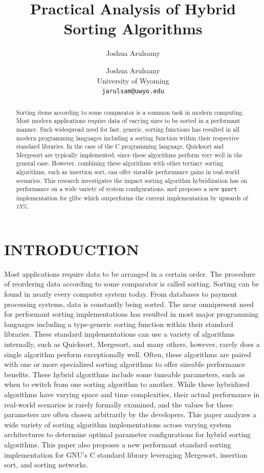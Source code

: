 \documentclass[12pt, conference]{ieeeconf}
\title{\LARGE \bf Practical Analysis of Hybrid Sorting Algorithms}
\author{Joshua Arulsamy}
\author{\parbox{3 in}{
\centering
Joshua Arulsamy\\
University of Wyoming\\
{\tt\small jarulsam@uwyo.edu}}}
\begin{document}
\maketitle
\thispagestyle{plain}
\pagestyle{plain}
\nocite{*}

\begin{abstract}

  Sorting items according to some comparator is a common task in modern
  computing. Most modern applications require data of varying sizes to be sorted
  in a performant manner. Such widespread need for fast, generic, sorting
  functions has resulted in all modern programming languages including a sorting
  function within their respective standard libraries. In the case of the C
  programming language, Quicksort and Mergesort are typically implemented, since
  these algorithms perform very well in the general case. However, combining
  these algorithms with other tertiary sorting algorithms, such as insertion
  sort, can offer sizeable performance gains in real-world scenarios. This
  research investigates the impact sorting algorithm hybridization has on
  performance on a wide variety of system configurations, and proposes a new
  \texttt{qsort} implementation for glibc which outperforms the current
  implementation by upwards of 15\%.

\end{abstract}

\section{INTRODUCTION}

Most applications require data to be arranged in a certain order. The procedure
of reordering data according to some comparator is called sorting. Sorting can
be found in nearly every computer system today. From databases to payment
processing systems, data is constantly being sorted. The near omnipresent need
for performant sorting implementations has resulted in most major programming
languages including a type-generic sorting function within their standard
libraries. These standard implementations can use a variety of algorithms
internally, such as Quicksort, Mergesort, and many others, however, rarely does
a single algorithm perform exceptionally well. Often, these algorithms are
paired with one or more specialized sorting algorithms to offer sizeable
performance benefits. These hybrid algorithms include some tuneable parameters,
such as when to switch from one sorting algorithm to another. While these
hybridized algorithms have varying space and time complexities, their actual
performance in real-world scenarios is rarely formally examined, and the values
for these parameters are often chosen arbitrarily by the developers. This paper
analyzes a wide variety of sorting algorithm implementations across varying
system architectures to determine optimal parameter configurations for hybrid
sorting algorithms. This paper also proposes a new performant standard sorting
implementation for GNU's C standard library leveraging Mergesort, insertion
sort, and sorting networks.
\end{document}
